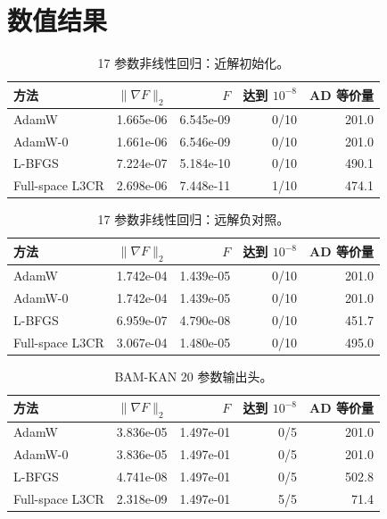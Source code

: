 \documentclass[UTF8,11pt,fontset=none]{ctexart}
\begin{document}
\section{数值结果}
\begin{table}[H]
\centering
\caption{17 参数非线性回归：近解初始化。}
\begin{tabular}{lrrrr}
\toprule
方法 & $\lVert\nabla F\rVert_2$ & $F$ & 达到 $10^{-8}$ & AD 等价量\\
\midrule
AdamW & 1.665e-06 & 6.545e-09 & 0/10 & 201.0 \\
AdamW-0 & 1.661e-06 & 6.546e-09 & 0/10 & 201.0 \\
L-BFGS & 7.224e-07 & 5.184e-10 & 0/10 & 490.1 \\
Full-space L3CR & 2.698e-06 & 7.448e-11 & 1/10 & 474.1 \\
\bottomrule
\end{tabular}
\end{table}

\begin{table}[H]
\centering
\caption{17 参数非线性回归：远解负对照。}
\begin{tabular}{lrrrr}
\toprule
方法 & $\lVert\nabla F\rVert_2$ & $F$ & 达到 $10^{-8}$ & AD 等价量\\
\midrule
AdamW & 1.742e-04 & 1.439e-05 & 0/10 & 201.0 \\
AdamW-0 & 1.742e-04 & 1.439e-05 & 0/10 & 201.0 \\
L-BFGS & 6.959e-07 & 4.790e-08 & 0/10 & 451.7 \\
Full-space L3CR & 3.067e-04 & 1.480e-05 & 0/10 & 495.0 \\
\bottomrule
\end{tabular}
\end{table}

\begin{table}[H]
\centering
\caption{BAM-KAN 20 参数输出头。}
\begin{tabular}{lrrrr}
\toprule
方法 & $\lVert\nabla F\rVert_2$ & $F$ & 达到 $10^{-8}$ & AD 等价量\\
\midrule
AdamW & 3.836e-05 & 1.497e-01 & 0/5 & 201.0 \\
AdamW-0 & 3.836e-05 & 1.497e-01 & 0/5 & 201.0 \\
L-BFGS & 4.741e-08 & 1.497e-01 & 0/5 & 502.8 \\
Full-space L3CR & 2.318e-09 & 1.497e-01 & 5/5 & 71.4 \\
\bottomrule
\end{tabular}
\end{table}
\end{document}
